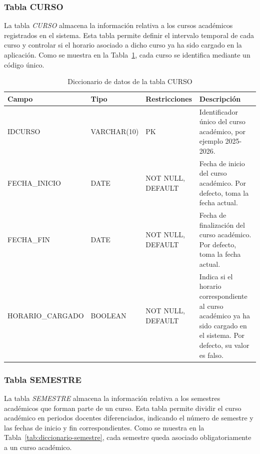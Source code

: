 \subsubsection{Tabla CURSO}

 La tabla \textit{CURSO} almacena la información relativa a los cursos académicos registrados en el sistema. Esta tabla permite definir el intervalo temporal de cada curso y controlar si el horario asociado a dicho curso ya ha sido cargado en la aplicación. Como se muestra en la Tabla~\ref{tab:diccionario-curso}, cada curso se identifica mediante un código único.\\

\begin{table}[H]
	\centering
	\scriptsize
	\setlength{\tabcolsep}{3pt}
	\renewcommand{\arraystretch}{1.15}
	\begin{tabularx}{\textwidth}{@{}
			>{\raggedright\arraybackslash}p{2.6cm}
			>{\raggedright\arraybackslash}p{2.2cm}
			>{\raggedright\arraybackslash}p{2.2cm}
			X@{}}
		\toprule
		\textbf{Campo} & \textbf{Tipo} & \textbf{Restricciones} & \textbf{Descripción} \\
		\midrule
		IDCURSO & VARCHAR(10) & PK & Identificador único del curso académico, por ejemplo 2025-2026. \\
		FECHA\_\newline INICIO & DATE & NOT NULL, DEFAULT & Fecha de inicio del curso académico. Por defecto, toma la fecha actual. \\
		FECHA\_FIN & DATE & NOT NULL, DEFAULT & Fecha de finalización del curso académico. Por defecto, toma la fecha actual. \\
		HORARIO\_\newline CARGADO & BOOLEAN & NOT NULL, DEFAULT & Indica si el horario correspondiente al curso académico ya ha sido cargado en el sistema. Por defecto, su valor es falso. \\
		\bottomrule
	\end{tabularx}
	\caption{Diccionario de datos de la tabla CURSO}
	\label{tab:diccionario-curso}
\end{table}

\subsubsection{Tabla SEMESTRE}

 La tabla \textit{SEMESTRE} almacena la información relativa a los semestres académicos que forman parte de un curso. Esta tabla permite dividir el curso académico en periodos docentes diferenciados, indicando el número de semestre y las fechas de inicio y fin correspondientes. Como se muestra en la Tabla~\ref{tab:diccionario-semestre}, cada semestre queda asociado obligatoriamente a un curso académico.\\

